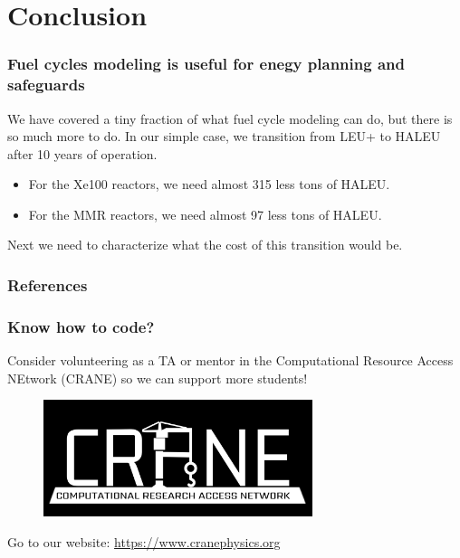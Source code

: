 \documentclass[9pt]{beamer}
\begin{document}
  \section{Conclusion}
  \begin{frame}
      \frametitle{Fuel cycles modeling is useful for enegy planning and safeguards}
      We have covered a tiny fraction of what fuel cycle modeling can do, but there is so much more to do. In our simple case, we transition from LEU+ to HALEU after 10 years of operation.
      \begin{itemize}
          \item For the Xe100 reactors, we need almost 315 less tons of HALEU.
          \item For the MMR reactors, we need almost 97 less tons of HALEU.
      \end{itemize}
      Next we need to characterize what the cost of this transition would be.
  \end{frame}






\begin{frame}[allowframebreaks]
  \frametitle{References}
  
  {\footnotesize  }

\end{frame}

\appendix

\begin{frame}
    \frametitle{Know how to code?}
    Consider volunteering as a TA or mentor in the Computational Resource Access NEtwork (CRANE) so we can support more students!
    \begin{figure}
        \centering
        \includegraphics[width=0.7\textwidth]{../images/CRANE_logo_inverted.png}
    \end{figure}
    Go to our website: \url{https://www.cranephysics.org}
\end{frame}

\end{document}
